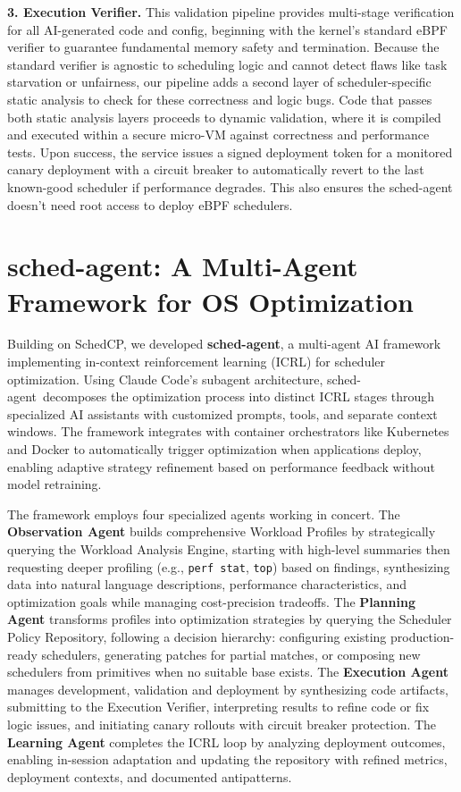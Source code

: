 \documentclass[preprint]{article}
\newcommand{\sys}{SchedCP\xspace}
\newcommand{\agent}{sched-agent\xspace}
\begin{document}
\textbf{3. Execution Verifier.} This validation pipeline provides multi-stage verification for all AI-generated code and config, beginning with the kernel's standard eBPF verifier to guarantee fundamental memory safety and termination. Because the standard verifier is agnostic to scheduling logic and cannot detect flaws like task starvation or unfairness, our pipeline adds a second layer of scheduler-specific static analysis to check for these correctness and logic bugs. Code that passes both static analysis layers proceeds to dynamic validation, where it is compiled and executed within a secure micro-VM against correctness and performance tests. Upon success, the service issues a signed deployment token for a monitored canary deployment with a circuit breaker to automatically revert to the last known-good scheduler if performance degrades. This also ensures the \agent doesn't need root access to deploy eBPF schedulers.

\section{\agent: A Multi-Agent Framework for OS Optimization}
\label{sec:sched_agents}

Building on \sys, we developed \textbf{\agent}, a multi-agent AI framework implementing in-context reinforcement learning (ICRL)\cite{incontextrl} for scheduler optimization. Using Claude Code's subagent architecture\cite{anthropic2024subagents}, \agent\ decomposes the optimization process into distinct ICRL stages through specialized AI assistants with customized prompts, tools, and separate context windows\cite{anthropic2024multiagent}. The framework integrates with container orchestrators like Kubernetes and Docker to automatically trigger optimization when applications deploy, enabling adaptive strategy refinement based on performance feedback without model retraining.

The framework employs four specialized agents working in concert. The \textbf{Observation Agent} builds comprehensive Workload Profiles by strategically querying the Workload Analysis Engine, starting with high-level summaries then requesting deeper profiling (e.g., \texttt{perf stat}, \texttt{top}) based on findings, synthesizing data into natural language descriptions, performance characteristics, and optimization goals while managing cost-precision tradeoffs. The \textbf{Planning Agent} transforms profiles into optimization strategies by querying the Scheduler Policy Repository, following a decision hierarchy: configuring existing production-ready schedulers, generating patches for partial matches, or composing new schedulers from primitives when no suitable base exists. The \textbf{Execution Agent} manages development, validation and deployment by synthesizing code artifacts, submitting to the Execution Verifier, interpreting results to refine code or fix logic issues, and initiating canary rollouts with circuit breaker protection. The \textbf{Learning Agent} completes the ICRL loop by analyzing deployment outcomes, enabling in-session adaptation and updating the repository with refined metrics, deployment contexts, and documented antipatterns.
\end{document}
